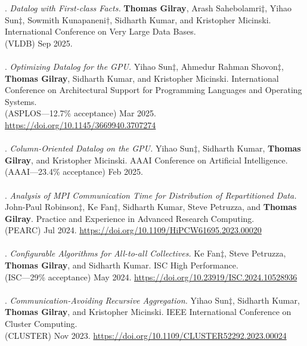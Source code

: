 \paper. \textit{Datalog with First-class Facts.}
\textbf{Thomas Gilray}, Arash Sahebolamri$\ddagger$, Yihao Sun$\ddagger$, Sowmith Kunapaneni$\dagger$, Sidharth Kumar, and Kristopher Micinski.
International Conference on Very Large Data Bases.
\\(VLDB) Sep 2025.
\\ \vspace{-0.1cm}\\
\paper. \textit{Optimizing Datalog for the GPU.}
Yihao Sun$\ddagger$, Ahmedur Rahman Shovon$\ddagger$, \textbf{Thomas Gilray}, Sidharth Kumar, and Kristopher Micinski.
International Conference on Architectural Support for Programming Languages and Operating Systems.
\\(ASPLOS---12.7\% acceptance) Mar 2025. \url{https://doi.org/10.1145/3669940.3707274}
\\ \vspace{-0.1cm}\\
\paper. \textit{Column-Oriented Datalog on the GPU.}
Yihao Sun$\ddagger$, Sidharth Kumar, \textbf{Thomas Gilray}, and Kristopher Micinski.
AAAI Conference on Artificial Intelligence.
\\(AAAI---23.4\% acceptance) Feb 2025.
\\ \vspace{-0.1cm}\\
\paper. \textit{Analysis of MPI Communication Time for Distribution of Repartitioned Data.}
John-Paul Robinson$\ddagger$, Ke Fan$\ddagger$, Sidharth Kumar, Steve Petruzza, and \textbf{Thomas Gilray}.
Practice and Experience in Advanced Research Computing.
\\(PEARC) Jul 2024. \url{https://doi.org/10.1109/HiPCW61695.2023.00020}
\\ \vspace{-0.1cm}\\
\paper. \textit{Configurable Algorithms for All-to-all Collectives.}
Ke Fan$\ddagger$, Steve Petruzza, \textbf{Thomas Gilray}, and Sidharth Kumar.
ISC High Performance.
\\(ISC---29\% acceptance) May 2024. \url{https://doi.org/10.23919/ISC.2024.10528936}
\\ \vspace{-0.1cm}\\
\paper. \textit{Communication-Avoiding Recursive Aggregation.}
Yihao Sun$\ddagger$, Sidharth Kumar, \textbf{Thomas Gilray}, and Kristopher Micinski.
IEEE International Conference on Cluster Computing.
\\(CLUSTER) Nov 2023. \url{https://doi.org/10.1109/CLUSTER52292.2023.00024}
